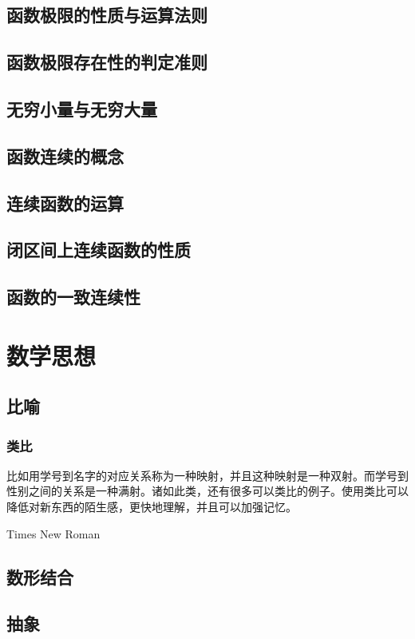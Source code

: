 \documentclass[shortmath]{AirNote}
\begin{document}
\section{函数极限的性质与运算法则}
\section{函数极限存在性的判定准则}
\section{无穷小量与无穷大量}
\section{函数连续的概念}
\section{连续函数的运算}
\section{闭区间上连续函数的性质}
\section{函数的一致连续性}

\chapter{数学思想}
\section{比喻}
\subsection{类比}
比如用学号到名字的对应关系称为一种映射，并且这种映射是一种双射。而学号到性别之间的关系是一种满射。诸如此类，还有很多可以类比的例子。使用类比可以降低对新东西的陌生感，更快地理解，并且可以加强记忆。

Times New Roman

\section{数形结合}
\section{抽象}
\end{document}
